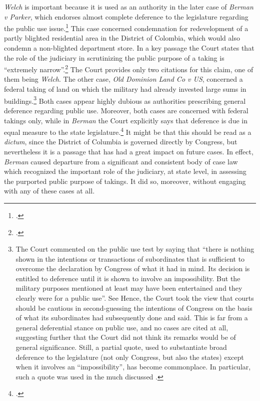 {\it Welch} is important because it is used as an authority in the later case of {\it Berman v Parker}, which endorses almost complete deference to the legislature regarding the public use issue.\footcite[32]{berman54} This case concerned condemnation for redevelopment of a partly blighted residential area in the District of Colombia, which would also condemn a non-blighted department store. In a key passage the Court states that the role of the judiciary in scrutinizing the public purpose of a taking is ``extremely narrow''.\footcite[32]{berman54} The Court provides only two citations for this claim, one of them being {\it Welch}. The other case, {\it Old Dominion Land Co v US}, concerned a federal taking of land on which the military had already invested large sums in buildings.\footnote{The Court commented on the public use test by saying that ``there is nothing shown in the intentions or transactions of subordinates that is sufficient to overcome the declaration by Congress of what it had in mind. Its decision is entitled to deference until it is shown to involve an impossibility. But the military purposes mentioned at least may have been entertained and they clearly were for a public use''. See \cite[66]{dominion25} Hence, the Court took the view that courts should be cautious in second-guessing the intentions of Congress on the basis of what its subordinates had subsequently done and said. This is far from a general deferential stance on public use, and no cases are cited at all, suggesting further that the Court did not think its remarks would be of general significance. Still, a partial quote, used to substantiate  broad deference to the legislature (not only Congress, but also the states) except when it involves an ``impossibility'', has become commonplace. In particular, such a quote was used in the much discussed \cite[240]{midkiff}.}
Both cases appear highly dubious as authorities prescribing general deference regarding public use. Moreover, both cases are concerned with federal takings only, while in {\it Berman} the Court explicitly says that deference is due in equal measure to the state legislature.\footcite[32]{berman54} It might be that this should be read as a {\it dictum}, since the District of Columbia is governed directly by Congress, but nevertheless it is a passage that has had a great impact on future cases. In effect, {\it Berman} caused departure from a significant and consistent body of case law which recognized the important role of the judiciary, at state level, in assessing the purported public purpose of takings. It did so, moreover, without engaging with any of these cases at all.

